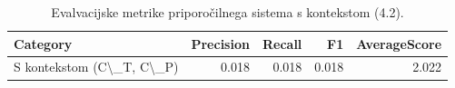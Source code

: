 \begin{table}[h]
\centering
\caption{Evalvacijske metrike priporočilnega sistema s kontekstom (4.2).}
\label{tab:evaluation_metrics_4_2}
\begin{tabular}{lrrrr}
\toprule
Category & Precision & Recall & F1 & AverageScore \\
\midrule
S kontekstom (C\textbackslash \_T, C\textbackslash \_P) & 0.018 & 0.018 & 0.018 & 2.022 \\
\bottomrule
\end{tabular}

\end{table}
